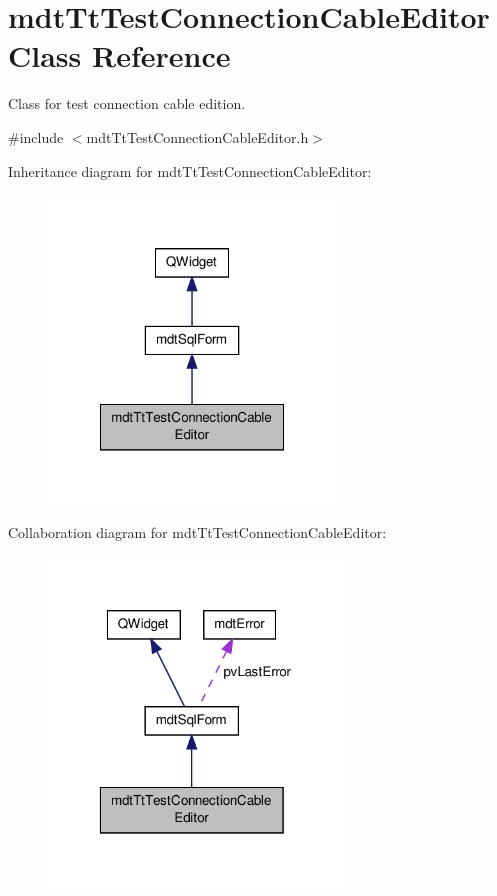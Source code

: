 \hypertarget{classmdt_tt_test_connection_cable_editor}{\section{mdt\-Tt\-Test\-Connection\-Cable\-Editor Class Reference}
\label{classmdt_tt_test_connection_cable_editor}
}


Class for test connection cable edition.  




{\ttfamily \#include $<$mdt\-Tt\-Test\-Connection\-Cable\-Editor.\-h$>$}



Inheritance diagram for mdt\-Tt\-Test\-Connection\-Cable\-Editor\-:
\nopagebreak
\begin{figure}[H]
\begin{center}
\leavevmode
\includegraphics[width=216pt]{classmdt_tt_test_connection_cable_editor__inherit__graph}
\end{center}
\end{figure}


Collaboration diagram for mdt\-Tt\-Test\-Connection\-Cable\-Editor\-:
\nopagebreak
\begin{figure}[H]
\begin{center}
\leavevmode
\includegraphics[width=223pt]{classmdt_tt_test_connection_cable_editor__coll__graph}
\end{center}
\end{figure}
